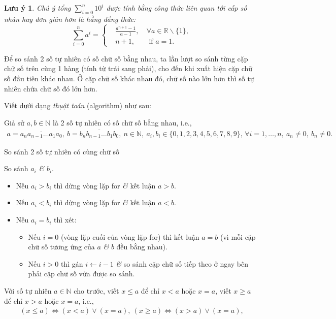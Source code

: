 \documentclass{article}
\numberwithin{equation}{section}
\newtheorem{luuy}{Lưu ý}[section]
\begin{document}
\begin{luuy}
	Chú ý tổng $\sum_{i=0}^n 10^i$ được tính bằng công thức liên quan tới \textit{cấp số nhân} hay đơn giản hơn là hằng đẳng thức:
	\begin{equation*}
		\sum_{i=0}^n a^i = \left\{\begin{split}
			&\frac{a^{n+1} - 1}{a - 1},\ &\forall a\in\mathbb{R}\backslash\{1\},\\
			&n + 1,&\mbox{ if } a = 1.
		\end{split}\right.
	\end{equation*}
\end{luuy}

\begin{tcolorbox}
	Để so sánh 2 số tự nhiên có số chữ số bằng nhau, ta lần lượt so sánh từng cặp chữ số trên cùng 1 hàng (tính từ trái sang phải), cho đến khi xuất hiện cặp chữ số đầu tiên khác nhau. Ở cặp chữ số khác nhau đó, chữ số nào lớn hơn thì số tự nhiên chứa chữ số đó lớn hơn.
\end{tcolorbox}
Viết dưới dạng \textit{thụật toán} (algorithm) như sau:

Giả sử $a,b\in\mathbb{N}$ là 2 số tự nhiên có số chữ số bằng nhau, i.e.,
\begin{align*}
	a = \overline{a_na_{n-1}\ldots a_1a_0},\ b = \overline{b_nb_{n-1}\ldots b_1b_0},\ n\in\mathbb{N},\ a_i,b_i\in\{0,1,2,3,4,5,6,7,8,9\},\,\forall i = 1,\ldots,n,\ a_n\ne 0,\ b_n\ne 0.
\end{align*}

\begin{algorithm}
	\caption{So sánh 2 số tự nhiên có cùng chữ số}\label{alg:compare naturals with same digits}
	\begin{algorithmic}[1]
		 So sánh $a_i$ \textit{\&} $b_i$.
		\begin{itemize}
			\item Nếu $a_i > b_i$ thì dừng vòng lặp for \textit{\&} kết luận $a > b$.
			\item Nếu $a_i < b_i$ thì dừng vòng lặp for \textit{\&} kết luận $a < b$.
			\item Nếu $a_i = b_i$ thì xét:
			\begin{itemize}
				\item Nếu $i = 0$ (vòng lặp cuối của vòng lặp for) thì kết luận $a = b$ (vì mỗi cặp chữ số tương ứng của $a$ \textit{\&} $b$ đều bằng nhau).
				\item Nếu $i > 0$ thì gán $i\leftarrow i - 1$ \textit{\&} so sánh cặp chữ số tiếp theo ở ngay bên phải cặp chữ số vừa được so sánh.
			\end{itemize}			 
		\end{itemize}		
		\EndFor
	\end{algorithmic}
\end{algorithm}
Với số tự nhiên $a\in\mathbb{N}$ cho trước, viết $x\le a$ để chỉ $x < a$ hoặc $x = a$, viết $x\ge a$ để chỉ $x > a$ hoặc $x = a$, i.e.,
\begin{align*}
	(x\le a)\Leftrightarrow(x < a)\lor(x = a),\ (x\ge a)\Leftrightarrow(x > a)\lor(x = a),
\end{align*}
\end{document}
